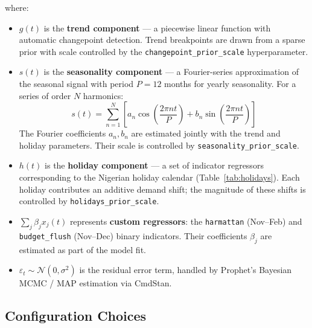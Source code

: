 \documentclass[12pt, a4paper]{article}
\begin{document}
where:
\begin{itemize}[leftmargin=1.5em, itemsep=4pt]
  \item $g(t)$ is the \textbf{trend component} --- a piecewise linear
        function with automatic changepoint detection. Trend breakpoints
        are drawn from a sparse prior with scale controlled by the
        \texttt{changepoint\_prior\_scale} hyperparameter.

  \item $s(t)$ is the \textbf{seasonality component} --- a Fourier-series
        approximation of the seasonal signal with period $P = 12$ months
        for yearly seasonality. For a series of order $N$ harmonics:
        \[
          s(t) = \sum_{n=1}^{N} \left[
            a_n \cos\!\left(\frac{2\pi n t}{P}\right) +
            b_n \sin\!\left(\frac{2\pi n t}{P}\right)
          \right]
        \]
        The Fourier coefficients $a_n, b_n$ are estimated jointly with
        the trend and holiday parameters. Their scale is controlled by
        \texttt{seasonality\_prior\_scale}.

  \item $h(t)$ is the \textbf{holiday component} --- a set of
        indicator regressors corresponding to the Nigerian holiday
        calendar (Table~\ref{tab:holidays}). Each holiday contributes an
        additive demand shift; the magnitude of these shifts is controlled
        by \texttt{holidays\_prior\_scale}.

  \item $\sum_j \beta_j x_j(t)$ represents \textbf{custom regressors}:
        the \texttt{harmattan} (Nov--Feb) and \texttt{budget\_flush}
        (Nov--Dec) binary indicators. Their coefficients $\beta_j$ are
        estimated as part of the model fit.

  \item $\varepsilon_t \sim \mathcal{N}(0, \sigma^2)$ is the residual
        error term, handled by Prophet's Bayesian MCMC / MAP estimation
        via CmdStan.
\end{itemize}

\subsection{Configuration Choices}
\end{document}
